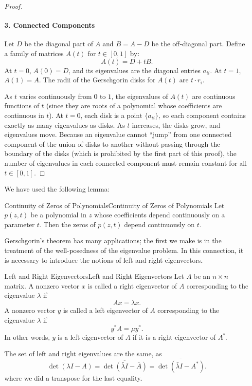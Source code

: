 \documentclass[../main.tex]{subfiles}
\begin{document}
\begin{proof}
	\paragraph{3. Connected Components}
	Let $D$ be the diagonal part of $A$ and $B = A - D$ be the off-diagonal part. Define a family of matrices $A(t)$ for $t \in [0, 1]$ by:
	\begin{equation*}
		A(t) = D + tB.
	\end{equation*}
	At $t=0$, $A(0) = D$, and its eigenvalues are the diagonal entries $a_{ii}$. At $t=1$, $A(1) = A$. The radii of the Gerschgorin disks for $A(t)$ are $t \cdot r_i$.

	As $t$ varies continuously from $0$ to $1$, the eigenvalues of $A(t)$ are continuous functions of $t$ (since they are roots of a polynomial whose coefficients are continuous in $t$). At $t=0$, each disk is a point $\{a_{ii}\}$, so each component contains exactly as many eigenvalues as disks. As $t$ increases, the disks grow, and eigenvalues move. Because an eigenvalue cannot ``jump'' from one connected component of the union of disks to another without passing through the boundary of the disks (which is prohibited by the first part of this proof), the number of eigenvalues in each connected component must remain constant for all $t \in [0, 1]$.
\end{proof}

We have used the following lemma:
\begin{lemma}{Continuity of Zeros of Polynomials}{Continuity of Zeros of Polynomials}
	Let $p(z, t)$ be a polynomial in $z$ whose coefficients depend continuously on a parameter $t$. Then the zeros of $p(z, t)$ depend continuously on $t$.
\end{lemma}

Gerschgorin's theorem has many applications; the first we make is in the treatment of the well-posedness of the eigenvalue problem. In this connection, it is necessary to introduce the notions of left and right eigenvectors.
\begin{definition}{Left and Right Eigenvectors}{Left and Right Eigenvectors}
	Let $A$ be an $n \times n$ matrix. A nonzero vector $x$ is called a right eigenvector of $A$ corresponding to the eigenvalue $\lambda$ if
	\begin{equation*}
		Ax = \lambda x.
	\end{equation*}
	A nonzero vector $y$ is called a left eigenvector of $A$ corresponding to the eigenvalue $\lambda$ if
	\begin{equation*}
		y^* A = \mu y^*.
	\end{equation*}
	In other words, $y$ is a left eigenvector of $A$ if it is a right eigenvector of $A^*$.
\end{definition}
The set of left and right eigenvalues are the same, as
\begin{equation*}
	\det(\lambda I - A) = \overline{\det(\bar{\lambda} I - \overline{A})} = \overline{\det(\bar{\lambda} I - A^*)}.
\end{equation*}
where we did a transpose for the last equality.
\end{document}
